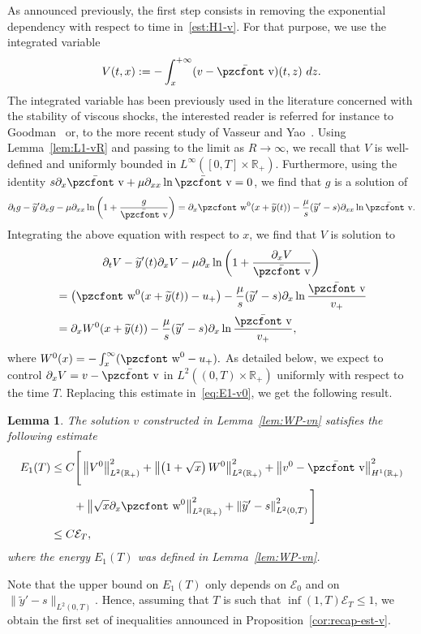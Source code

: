 \documentclass[10pt]{amsart}
\newtheorem{lemm}[theo]{Lemma}\newtheorem{prop}[theo]{Proposition}\newtheorem{coro}[theo]{Corollary}\newtheorem{conj}[theo]{Conjecture}
\theoremstyle{definition}\newtheorem{defi}[theo]{Definition}\newtheorem{rema}[theo]{Remark}\newtheorem{exam}[theo]{Example}\newtheorem{exem}[theo]{Example}\newtheorem{nota}[theo]{Notation}
\newcommand{\mathpzc}[1]{\text{\pzcfont #1}}
\newcommand{\R}{\mathbb{R}}
\newcommand{\p}{\partial}
\newcommand{\bv}{\bar{\mathpzc{v}}}
\newcommand{\cE}{\mathcal E}
\newcommand{\tw}{\mathpzc{w}}
\newcommand{\ty}{\widetilde{y}}
\begin{document}
As announced previously, the first step consists in removing the exponential dependency with respect to time in~\eqref{est:H1-v}. For that purpose, we use the integrated variable
\begin{equation}\label{df:V}
V(t,x) := -\int_x^{+\infty} (v - \bv)(t,z) \ dz.
\end{equation}
{The integrated variable has been previously used in the literature concerned with the stability of viscous shocks, the interested reader is referred for instance to Goodman~\cite{goodman1986} or, to the more recent study of Vasseur and Yao~\cite{vasseur2016}.} Using Lemma~\ref{lem:L1-vR} and passing to the limit as $R\to \infty$, we recall that $V$ is well-defined and uniformly bounded in $L^\infty([0,T]\times \R_+)$. Furthermore, using the identity $s\p_x \bv + \mu \p_{xx} \ln \bv=0 $, we find that $g$ is a solution of
\begin{equation}\label{eq:g}
\p_t g - \ty'\p_x g -\mu \p_{xx}\ln \left(1 + \frac{g}{\bv}\right)=\p_x \tw^0(x+\ty(t)) - \frac{\mu}{s}(\ty'-s)\p_{xx}\ln \bv.
\end{equation}
Integrating the above equation with respect to $x$, we find that $V$ is solution to
\begin{multline}\label{eq:V}
\partial_t V - \ty'(t) \partial_x V - \mu \partial_x \ln \left(1 + \dfrac{\partial_x V}{\bv} \right)\\
\begin{aligned}
& = \big(\tw^0(x + \ty(t)) - u_+ \big) - \dfrac{\mu}{s}(\ty'-s)\partial_x \ln \dfrac{\bv}{v_+}\\
&=\p_x W^0(x+\ty(t))- \dfrac{\mu}{s} (\ty'-s)\partial_x \ln \dfrac{\bv}{v_+},
\end{aligned}
\end{multline}
where $W^0(x)=-\int_x^\infty (\tw^0 - u_+).$ As detailed below, we expect to control $\partial_x V=v-\bv$ in $L^2((0,T)\times \R_+)$ uniformly with respect to the time $T$. Replacing this estimate in~\eqref{eq:E1-v0}, we get the following result.

\begin{lemm}\label{lem:L2-V}
The solution $v$ constructed in Lemma~\ref{lem:WP-vn} satisfies the following estimate
\begin{equation}\label{eq:est-H1-v}
\begin{split}
E_1(T) & \leq C \Bigg[\left\|V^{0}\right\|_{L^2(\R_+)}^2 +\left\|\left(1+\sqrt{x}\right) W^0\right\|_{L^2(\R_+)}^2+ \left\|v^0-\bv\right\|_{H^1(\R_+)}^2\\
& \qquad + \left\| \sqrt{x} \p_x \tw^0\right\|_{L^2(\R_+)}^2 + \left\|\ty'-s\right\|_{L^2(0,T)}^2 \Bigg]\\
& \leq C \cE_T,
\end{split}
\end{equation}
where the energy $E_1(T)$ was defined in Lemma~\ref{lem:WP-vn}.
\end{lemm} 
Note that the upper bound on $ E_1(T)$ only depends on $\cE_0$ and on $\|\ty'-s\|_{L^2(0,T)}$. Hence, assuming that $T$ is such that $\inf(1, T) \cE_T \leq 1$, we obtain the first set of inequalities announced in Proposition~\ref{cor:recap-est-v}.
\end{document}
